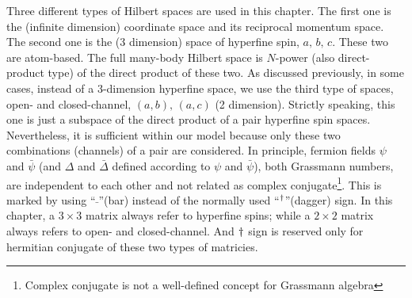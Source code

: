 Three different types of Hilbert spaces are used in this chapter.   The first one is the  (infinite dimension) coordinate space and its reciprocal momentum space.   The second one is the  (3 dimension) space of hyperfine spin, $a,\,b,\,c$.   These two are atom-based.  The full many-body Hilbert space is $N$-power (also direct-product type) of the direct product of these two.  As discussed previously, in some cases, instead of a 3-dimension hyperfine space, we use the third type of spaces, open- and closed-channel, $(a,b),\,(a,c)$ (2 dimension).  Strictly speaking, this one is just a subspace of the direct product of a pair hyperfine spin spaces.  Nevertheless,  it is sufficient within our model because only these two combinations (channels) of a pair are considered.    In principle, fermion fields $\psi$ and $\bar\psi$ (and $\Delta$ and $\bar\Delta$ defined according to $\psi$ and $\bar\psi$),  both Grassmann numbers, are independent to each other  and  not related as complex conjugate\footnote{Complex conjugate is not a well-defined concept for Grassmann algebra}.  This is marked by using ``$\bar{\;}$''(bar) instead of the normally used ``$^{\dagger}$''(dagger) sign. In this chapter, a $3\times3$ matrix always refer to hyperfine spins; while a $2\times2$ matrix always refers to  open- and closed-channel.  And $^{}\dagger$ sign  is reserved only for hermitian conjugate of these two types of matricies. 

